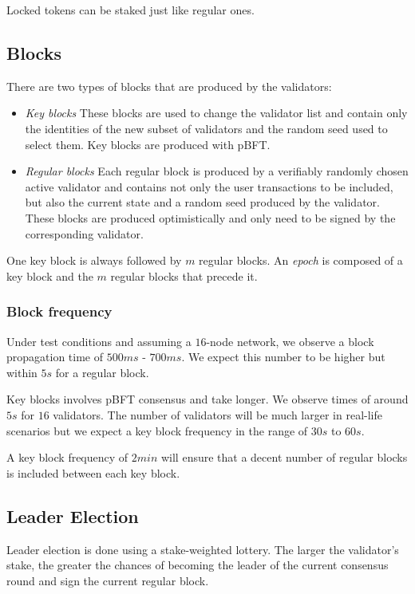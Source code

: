 \documentclass[8pt,fleqn,openany]{book}
\begin{document}
Locked tokens can be staked just like regular ones.

\subsection{Blocks}\label{sec:blocks}
There are two types of blocks that are produced by the validators:

\begin{itemize}
	\item {\em Key blocks} These blocks are used to change the validator list and contain only the identities of the new subset of validators and the random seed used to select them. Key blocks are produced with pBFT.
	\item {\em Regular blocks} Each regular block is produced by a verifiably randomly chosen active validator and contains not only the user transactions to be included, but also the current state and a random seed produced by the validator. These blocks are produced optimistically and only need to be signed by the corresponding validator.
\end{itemize}

One key block is always followed by $m$ regular blocks. An \textit{epoch} is composed of a key block and the $m$ regular blocks that precede it.

\subsubsection{Block frequency}
Under test conditions and assuming a $16$-node network, we observe a block propagation time of $500ms$ - $700ms$. We expect this number to be higher but within $5s$ for a regular block. 

Key blocks involves pBFT consensus and take longer. We observe times of around $5s$ for $16$ validators. The number of validators will be much larger in real-life scenarios but we expect a key block frequency in the range of $30s$ to $60s$.

A key block frequency of $2min$ will ensure that a decent number of regular blocks is included between each key block.

\subsection{Leader Election}
Leader election is done using a stake-weighted lottery. The larger the validator’s stake, the greater the chances of becoming the leader of the current consensus round and sign the current regular block.
\end{document}
